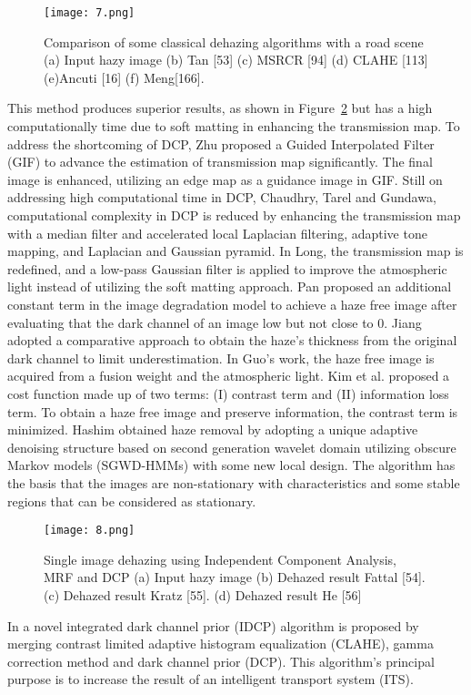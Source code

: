 \documentclass[doctor,english,listoffigures,listoftables]{thesis-uestc}
\begin{document}
\begin{figure}[H]
	\centering
	\texttt{[image: 7.png]}
	\caption{Comparison of some classical dehazing algorithms with a road scene (a) Input hazy image (b) Tan [53] (c) MSRCR [94] (d) CLAHE [113] (e)Ancuti [16] (f) Meng[166].}
	\label{fig7}
\end{figure}
 This method produces superior results, as shown in Figure~\ref{fig8} but has a high computationally time due to soft matting in enhancing the transmission map. To address the shortcoming of DCP, Zhu proposed a Guided Interpolated Filter (GIF) to advance the estimation of transmission map significantly. The final image is enhanced, utilizing an edge map as a guidance image in GIF. Still on addressing high computational time in DCP, Chaudhry, Tarel and Gundawa, computational complexity in DCP is reduced by enhancing the transmission map with a median filter and accelerated local Laplacian filtering, adaptive tone mapping, and Laplacian and Gaussian pyramid. In Long, the transmission map is redefined, and a low-pass Gaussian filter is applied to improve the atmospheric light instead of utilizing the soft matting approach. Pan proposed an additional constant term in the image degradation model to achieve a haze free image after evaluating that the dark channel of an image low but not close to 0. Jiang adopted a comparative approach to obtain the haze's thickness from the original dark channel to limit underestimation. In Guo's work, the haze free image is acquired from a fusion weight and the atmospheric light. Kim et al. proposed a cost function made up of two terms: (I) contrast term and (II) information loss term. To obtain a haze free image and preserve information, the contrast term is minimized. Hashim obtained haze removal by adopting a unique adaptive denoising structure based on second generation wavelet domain utilizing obscure Markov models (SGWD-HMMs) with some new local design. The algorithm has the basis that the images are non-stationary with characteristics and some stable regions that can be considered as stationary.

\begin{figure}[H]
	\centering
	\texttt{[image: 8.png]}
	\caption{Single image dehazing using Independent Component Analysis, MRF and DCP (a) Input hazy image (b) Dehazed result Fattal [54]. (c) Dehazed result Kratz [55]. (d) Dehazed result He [56]}
	\label{fig8}
\end{figure}
 In a novel integrated dark channel prior (IDCP) algorithm is proposed by merging contrast limited adaptive histogram equalization (CLAHE),  gamma correction method and dark channel prior (DCP). This algorithm's principal purpose is to increase the result of an intelligent transport system (ITS).
\end{document}
